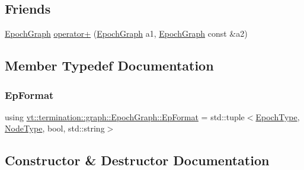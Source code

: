 \subsection*{Friends}
\begin{DoxyCompactItemize}
\item 
\hyperlink{structvt_1_1termination_1_1graph_1_1_epoch_graph}{Epoch\+Graph} \hyperlink{structvt_1_1termination_1_1graph_1_1_epoch_graph_a434b99e8fb7dc5980beb1389cb8b5e6e}{operator+} (\hyperlink{structvt_1_1termination_1_1graph_1_1_epoch_graph}{Epoch\+Graph} a1, \hyperlink{structvt_1_1termination_1_1graph_1_1_epoch_graph}{Epoch\+Graph} const \&a2)
\end{DoxyCompactItemize}


\subsection{Member Typedef Documentation}
\mbox{\label{structvt_1_1termination_1_1graph_1_1_epoch_graph_a127b9f54d98b9645451c2d9a2821d10e}} 
\subsubsection{\texorpdfstring{Ep\+Format}{EpFormat}}
{\footnotesize\ttfamily using \hyperlink{structvt_1_1termination_1_1graph_1_1_epoch_graph_a127b9f54d98b9645451c2d9a2821d10e}{vt\+::termination\+::graph\+::\+Epoch\+Graph\+::\+Ep\+Format} =  std\+::tuple$<$\hyperlink{namespacevt_a985a5adf291c34a3ca263b3378388236}{Epoch\+Type}, \hyperlink{namespacevt_a866da9d0efc19c0a1ce79e9e492f47e2}{Node\+Type}, bool, std\+::string$>$}



\subsection{Constructor \& Destructor Documentation}
\mbox{\label{structvt_1_1termination_1_1graph_1_1_epoch_graph_a2ad0e6af761b4ff43605ad9d3f33d709}} 

